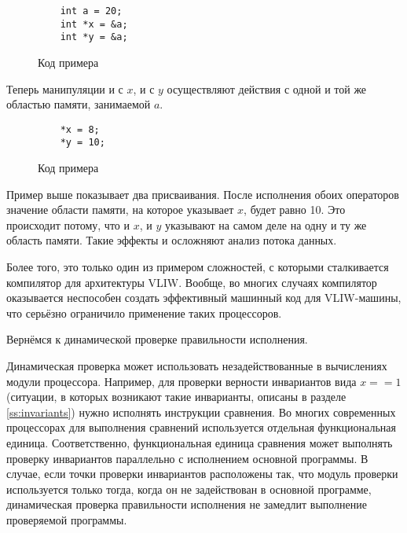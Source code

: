 \begin{figure}[H]
    \begin{verbatim}
    int a = 20;
    int *x = &a;
    int *y = &a;
    \end{verbatim}
    \label{fig:aliasing}
    \caption{Код примера}
\end{figure}

Теперь манипуляции и с $x$, и с $y$ осуществляют действия с одной и той же областью памяти, занимаемой $a$.

\begin{figure}[H]
    \begin{verbatim}
    *x = 8;
    *y = 10;
    \end{verbatim}
    \label{fig:aliasing-2}
    \caption{Код примера}
\end{figure}

Пример выше показывает два присваивания. После исполнения обоих операторов значение области памяти, на которое указывает $x$, будет равно 10. Это происходит потому, что и $x$, и $y$ указывают на самом деле на одну и ту же область памяти. Такие эффекты и осложняют анализ потока данных.

Более того, это только один из примером сложностей, с которыми сталкивается компилятор для архитектуры VLIW. Вообще, во многих случаях компилятор оказывается неспособен создать эффективный машинный код для VLIW-машины, что серьёзно ограничило применение таких процессоров.

Вернёмся к динамической проверке правильности исполнения.

Динамическая проверка может использовать незадействованные в вычислениях модули процессора. Например, для проверки верности инвариантов вида $x == 1$ (ситуации, в которых возникают такие инварианты, описаны в разделе \ref{ss:invariants}) нужно исполнять инструкции сравнения. Во многих современных процессорах для выполнения сравнений используется отдельная функциональная единица. Соответственно, функциональная единица сравнения может выполнять проверку инвариантов параллельно с исполнением основной программы. В случае, если точки проверки инвариантов расположены так, что модуль проверки используется только тогда, когда он не задействован в основной программе, динамическая проверка правильности исполнения не замедлит выполнение проверяемой программы.

